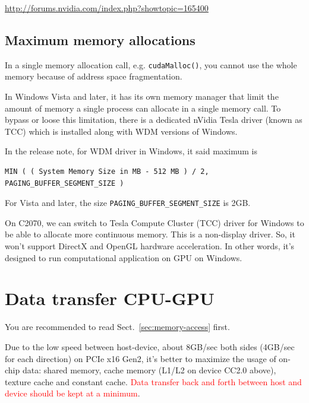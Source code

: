 \url{http://forums.nvidia.com/index.php?showtopic=165400}


\subsection{Maximum memory allocations}
\label{sec:max_mem_alloc}

In a single memory allocation call, e.g. \verb!cudaMalloc()!, you cannot use the
whole memory because of address space fragmentation. 

In Windows Vista and later, it has its own memory manager that limit the amount
of memory a single process can allocate in a single memory call. To bypass
or loose this limitation, there is a dedicated nVidia Tesla driver (known as
TCC) which is installed along with WDM versions of Windows. 

In the release note, for WDM driver in Windows, it said maximum is
\begin{verbatim}
MIN ( ( System Memory Size in MB - 512 MB ) / 2, PAGING_BUFFER_SEGMENT_SIZE )
\end{verbatim}
For Vista and later, the size \verb!PAGING_BUFFER_SEGMENT_SIZE! is 2GB. 

On C2070, we can switch to Tesla Compute Cluster (TCC) driver for Windows to be
able to allocate more continuous memory.
This is a non-display driver. So, it won't support DirectX and OpenGL hardware
acceleration. In other words, it's designed to run computational application on
GPU on Windows. 


\section{Data transfer CPU-GPU}
\label{sec:data-transfer-host-2}

You are recommended to read Sect.~\ref{sec:memory-access} first.

Due to the low speed between host-device, about 8GB/sec both sides
(4GB/sec for each direction) on PCIe x16 Gen2, it's better to maximize
the usage of on-chip data: shared memory, cache memory (L1/L2 on
device CC2.0 above), texture cache and constant cache.
\textcolor{red}{Data transfer back and forth between host and device
  should be kept at a minimum}.

